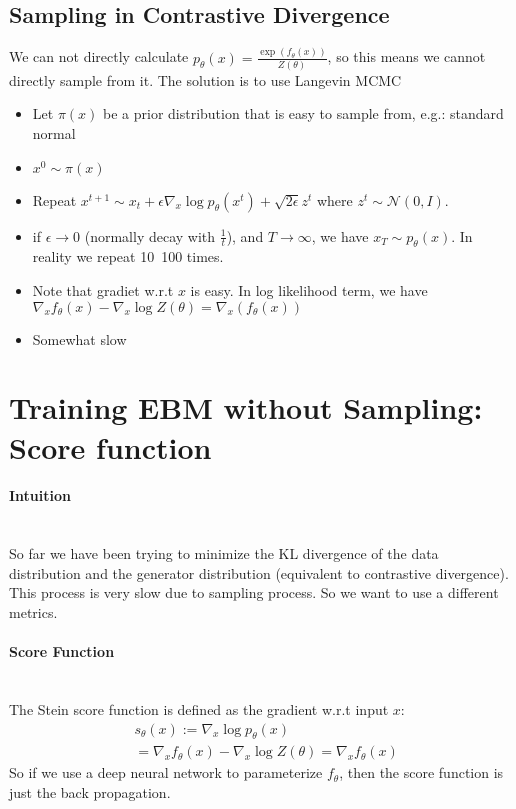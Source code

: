 \subsection{Sampling in Contrastive Divergence} 
We can not directly calculate $p_\theta(x) = \frac{\exp(f_\theta(x))}{Z(\theta)}$, so this means we cannot directly sample from it. The solution is to use Langevin MCMC
    \begin{itemize}
        \item Let $\pi(x)$ be a prior distribution that is easy to sample from, e.g.: standard normal\\
        \item $x^0 \sim \pi(x)$
        \item Repeat $x^{t+1} \sim x_t + \epsilon \nabla_x \log p_\theta(x^t) + \sqrt{2 \epsilon} z^t$ where $z^t\sim \mathcal{N}(0,I)$.
        \item if $\epsilon \to 0$ (normally decay with $\frac{1}{t}$), and $T\to \infty$, we have $x_T\sim p_\theta(x)$. In reality we repeat 10~100 times. 
        \item Note that gradiet w.r.t $x$ is easy. In log likelihood term, we have $\nabla_x f_\theta(x) - \nabla_x\log Z(\theta) = \nabla_x(f_\theta(x))$
        \item Somewhat slow
    \end{itemize}
    
\section{Training EBM without Sampling: Score function} 
\paragraph{Intuition} \mbox{}\\
So far we have been trying to minimize the KL divergence of the data distribution and the generator distribution (equivalent to contrastive divergence). This process is very slow due to sampling process. So we want to use a different metrics. \\

\paragraph{Score Function} \mbox{}\\
The Stein score function is defined as the gradient w.r.t input $x$:
    \begin{align*}
        & s_\theta(x) := \nabla_x \log p_\theta(x) \\
        & = \nabla_x f_\theta(x) - \nabla_x \log Z(\theta) = \nabla_x f_\theta(x) \tag{for EBM}
    \end{align*}
So if we use a deep neural network to parameterize $f_\theta$, then the score function is just the back propagation. \\

